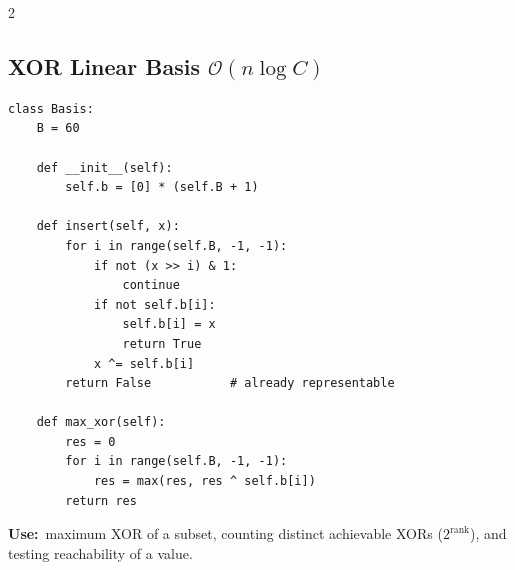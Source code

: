 \documentclass[10pt]{article}
\newcommand{\sub}[2]{\subsection[#1]{#1\hspace{0.6em}%
  \textnormal{\color{accent2}\small$\mathcal{O}(#2)$}}}
\newcommand{\uses}[1]{{\color{accent2}\footnotesize\textbf{Use:}}~{\footnotesize #1}\par}
\begin{document}
\begin{multicols}{2}
\sub{XOR Linear Basis}{n \log C}
\begin{lstlisting}
class Basis:
    B = 60

    def __init__(self):
        self.b = [0] * (self.B + 1)

    def insert(self, x):
        for i in range(self.B, -1, -1):
            if not (x >> i) & 1:
                continue
            if not self.b[i]:
                self.b[i] = x
                return True
            x ^= self.b[i]
        return False           # already representable

    def max_xor(self):
        res = 0
        for i in range(self.B, -1, -1):
            res = max(res, res ^ self.b[i])
        return res
\end{lstlisting}
\uses{maximum XOR of a subset, counting distinct achievable XORs
($2^{\text{rank}}$), and testing reachability of a value.}

\end{multicols}

\end{document}
